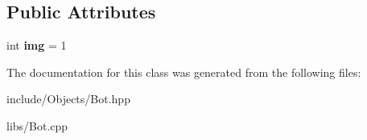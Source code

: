 \subsection*{Public Attributes}
\begin{DoxyCompactItemize}
\item 
\mbox{\label{classcp_1_1_bot_a6aca543540b0f5cbb1f1b276c6ec65be}} 
int {\bfseries img} = 1
\end{DoxyCompactItemize}


The documentation for this class was generated from the following files\+:\begin{DoxyCompactItemize}
\item 
include/\+Objects/Bot.\+hpp\item 
libs/Bot.\+cpp\end{DoxyCompactItemize}
